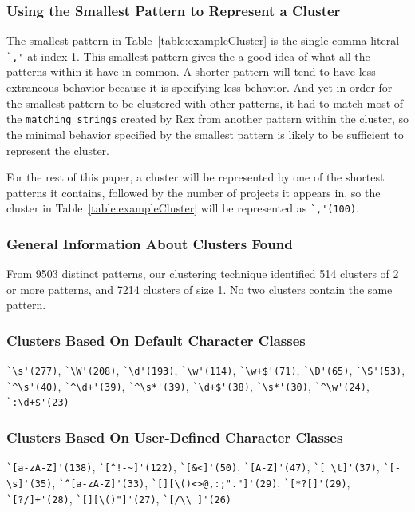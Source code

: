 \subsubsection{Using the Smallest Pattern to Represent a Cluster}
The smallest pattern in Table~\ref{table:exampleCluster} is the single comma literal \verb!`,'! at index 1.  This smallest pattern gives the a good idea of what all the patterns within it have in common.  A shorter pattern will tend to have less extraneous behavior because it is specifying less behavior.  And yet in order for the smallest pattern to be clustered with other patterns, it had to match most of the {\tt matching\_strings} created by Rex from another pattern within the cluster, so the minimal behavior specified by the smallest pattern is likely to be sufficient to represent the cluster.

For the rest of this paper, a cluster will be represented by one of the shortest patterns it contains, followed by the number of projects it appears in, so the cluster in Table~\ref{table:exampleCluster} will be represented as \verb!`,'(100)!.

\subsubsection{General Information About Clusters Found}
 From 9503 distinct patterns, our clustering technique identified 514 clusters of 2 or more patterns, and 7214 clusters of size 1.
No two clusters contain the same pattern.

\subsubsection{Clusters Based On Default Character Classes}
\verb!`\s'(277)!, \verb!`\W'(208)!, \verb!`\d'(193)!, \verb!`\w'(114)!, \verb!`\w+$'(71)!, \verb!`\D'(65)!, \verb!`\S'(53)!, \verb!`^\s'(40)!, \verb!`^\d+'(39)!, \verb!`^\s*'(39)!, \verb!`\d+$'(38)!, \verb!`\s*'(30)!, \verb!`^\w'(24)!, \verb!`:\d+$'(23)!

\subsubsection{Clusters Based On User-Defined Character Classes}
\verb!`[a-zA-Z]'(138)!, \verb•`[^!-~]'(122)•, \verb!`[&<]'(50)!, \verb!`[A-Z]'(47)!, \verb!`[ \t]'(37)!, \verb!`[-\s]'(35)!, \verb!`^[a-zA-Z]'(33)!, \verb!`[][\()<>@,:;"."]'(29)!, \verb!`[*?[]'(29)!, \verb!`[?/]+'(28)!, \verb!`[][\()"]'(27)!, \verb!`[/\\ ]'(26)!


